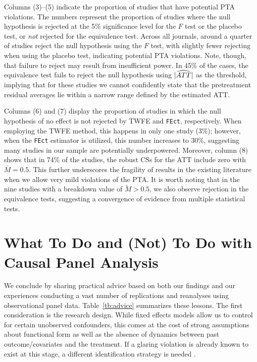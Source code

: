\documentclass[12pt]{article}
\begin{document}
Columns (3)--(5) indicate the proportion of studies that have potential PTA violations. The numbers represent the proportion of studies where the null hypothesis is rejected at the 5\% significance level for the $F$ test or the placebo test, or \emph{not} rejected for the equivalence test. Across all journals, around a quarter of studies reject the null hypothesis using the $F$ test, with slightly fewer rejecting when using the placebo test, indicating potential PTA violations. Note, though, that failure to reject may result from insufficient power. In 45\% of the cases, the equivalence test fails to reject the null hypothesis using $|\widehat{ATT}|$ as the threshold, implying that for these studies we cannot confidently state that the pretreatment residual averages lie within a narrow range defined by the estimated ATT. 

Columns (6) and (7) display the proportion of studies in which the null hypothesis of no effect is not rejected by TWFE and \texttt{FEct}, respectively. When employing the TWFE method, this happens in only one study (3\%); however, when the \texttt{FEct} estimator is utilized, this number increases to 30\%, suggesting many studies in our sample are potentially underpowered. Moreover, column (8) shows that in 74\% of the studies, the robust CSs for the ATT include zero with $\bar{M} = 0.5$. This further underscores the fragility of results in the existing literature when we allow very mild violations of the PTA. It is worth noting that in the nine studies with a breakdown value of $\tilde{M}>0.5$, we also observe rejection in the equivalence tests, suggesting a convergence of evidence from multiple statistical tests. 


\FloatBarrier




\section{What To Do and (Not) To Do with Causal Panel Analysis}

We conclude by sharing practical advice based on both our findings and our experiences conducting a vast number of replications and reanalyses using observational panel data. Table~\ref{tb:advice} summarizes these lessons. The first consideration is the research design. While fixed effects models allow us to control for certain unobserved confounders, this comes at the cost of strong assumptions about functional form as well as the absence of dynamics between past outcome/covariates and the treatment. If a glaring violation is already known to exist at this stage, a different identification strategy is needed \citep[e.g.,][]{Blackwell2018-br}.
\end{document}
